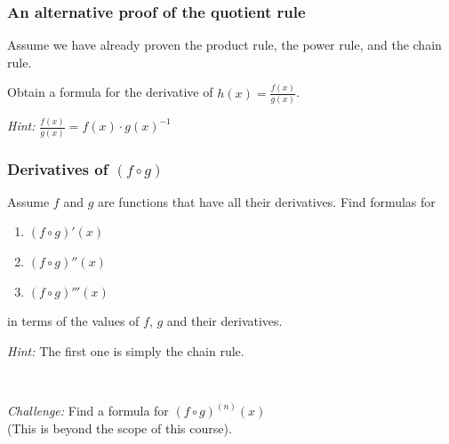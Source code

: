 \documentclass[14pt]{beamer}
\begin{document}
	\begin{frame}[t]
		\frametitle{An alternative proof of the quotient rule}

		Assume we have already proven the product rule, the power rule, and the
		chain rule.

		Obtain a formula for the derivative of
		$\displaystyle h(x) = \frac{f(x)}{g(x)}$.

		\emph{Hint:} $\displaystyle \frac{f(x)}{g(x)}= f(x) \cdot g(x)^{-1}$
	\end{frame}


	\begin{frame}
		\frametitle{Derivatives of $\displaystyle (f \circ g)$}

		Assume $f$ and $g$ are functions that have all their derivatives. Find formulas
		for
		\begin{enumerate}
			\item $\displaystyle (f \circ g)'(x)$

			\item $\displaystyle (f \circ g)''(x)$

			\item $\displaystyle (f \circ g)'''(x)$
		\end{enumerate}

		in terms of the values of $f$, $g$ and their derivatives.

		\emph{Hint:} The first one is simply the chain rule.

		\

		\emph{Challenge:} Find a formula for $\displaystyle (f \circ g)^{(n)}(x)$ \\
		(This is beyond the scope of this course).
	\end{frame}




\end{document}
